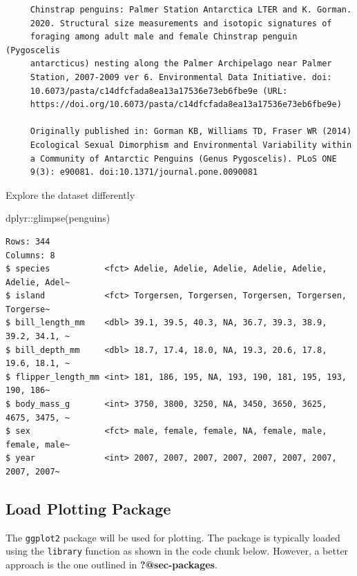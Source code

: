 \documentclass[
  letterpaper,
  DIV=11,
  numbers=noendperiod]{scrreprt}
\newenvironment{Shaded}{\begin{snugshade}}{\end{snugshade}}
\newcommand{\FunctionTok}[1]{\textcolor[rgb]{0.28,0.35,0.67}{#1}}
\newcommand{\NormalTok}[1]{\textcolor[rgb]{0.00,0.23,0.31}{#1}}
\newcommand{\SpecialCharTok}[1]{\textcolor[rgb]{0.37,0.37,0.37}{#1}}
\begin{document}
\begin{verbatim}
     Chinstrap penguins: Palmer Station Antarctica LTER and K. Gorman.
     2020. Structural size measurements and isotopic signatures of
     foraging among adult male and female Chinstrap penguin (Pygoscelis
     antarcticus) nesting along the Palmer Archipelago near Palmer
     Station, 2007-2009 ver 6. Environmental Data Initiative. doi:
     10.6073/pasta/c14dfcfada8ea13a17536e73eb6fbe9e (URL:
     https://doi.org/10.6073/pasta/c14dfcfada8ea13a17536e73eb6fbe9e)

     Originally published in: Gorman KB, Williams TD, Fraser WR (2014)
     Ecological Sexual Dimorphism and Environmental Variability within
     a Community of Antarctic Penguins (Genus Pygoscelis). PLoS ONE
     9(3): e90081. doi:10.1371/journal.pone.0090081
\end{verbatim}

Explore the dataset differently

\begin{Shaded}
\begin{Highlighting}[]
\NormalTok{dplyr}\SpecialCharTok{::}\FunctionTok{glimpse}\NormalTok{(penguins)}
\end{Highlighting}
\end{Shaded}

\begin{verbatim}
Rows: 344
Columns: 8
$ species           <fct> Adelie, Adelie, Adelie, Adelie, Adelie, Adelie, Adel~
$ island            <fct> Torgersen, Torgersen, Torgersen, Torgersen, Torgerse~
$ bill_length_mm    <dbl> 39.1, 39.5, 40.3, NA, 36.7, 39.3, 38.9, 39.2, 34.1, ~
$ bill_depth_mm     <dbl> 18.7, 17.4, 18.0, NA, 19.3, 20.6, 17.8, 19.6, 18.1, ~
$ flipper_length_mm <int> 181, 186, 195, NA, 193, 190, 181, 195, 193, 190, 186~
$ body_mass_g       <int> 3750, 3800, 3250, NA, 3450, 3650, 3625, 4675, 3475, ~
$ sex               <fct> male, female, female, NA, female, male, female, male~
$ year              <int> 2007, 2007, 2007, 2007, 2007, 2007, 2007, 2007, 2007~
\end{verbatim}

\subsection{Load Plotting Package}\label{load-plotting-package}

The \texttt{ggplot2} package will be used for plotting. The package is
typically loaded using the \texttt{library} function as shown in the
code chunk below. However, a better approach is the one outlined in
\textbf{?@sec-packages}.
\end{document}

